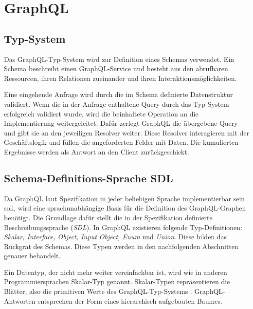 \chapter{GraphQL}
\section{Typ-System}

Das GraphQL-Typ-System wird zur Definition eines Schemas verwendet.
Ein Schema beschreibt einen GraphQL-Service und besteht aus den abrufbaren Ressourcen, ihren Relationen zueinander und ihren Interaktionsmöglichkeiten.


Eine eingehende Anfrage wird durch die im Schema definierte Datenstruktur validiert.
Wenn die in der Anfrage enthaltene Query durch das Typ-System erfolgreich validiert wurde, wird die beinhaltete Operation an die Implementierung weitergeleitet.
Dafür zerlegt GraphQL die übergebene Query und gibt sie an den jeweiligen Resolver weiter. Diese Resolver interagieren mit der Geschäftslogik und füllen die angeforderten Felder mit Daten.
Die kumulierten Ergebnisse werden als Antwort an den Client zurückgeschickt. 
\cite[S. 57-58]{kress2020graphql}
\cite[Abs. Schemadefinition]{graphqlOnline}


\section{Schema-Definitions-Sprache SDL}
Da GraphQL laut Spezifikation in jeder beliebigen Sprache implementierbar sein soll, wird eine sprachunabhängige Basis für die Definition des GraphQL-Graphen benötigt.
Die Grundlage dafür stellt die in der Spezifikation definierte Beschreibungssprache (\textit{SDL}). 
In GraphQL existieren folgende Typ-Definitionen: \textit{Skalar, Interface, Object, Input Object, Enum} und \textit{Union}.
Diese bilden das Rückgrat des Schemas.
Diese Typen werden in den nachfolgenden Abschnitten genauer behandelt.


Ein Datentyp, der nicht mehr weiter vereinfachbar ist, wird wie in anderen Programmiersprachen Skalar-Typ genannt.
Skalar-Typen repräsentieren die Blätter, also die primitiven Werte des GraphQL-Typ-Systems \cite[S. 60]{kress2020graphql}.
GraphQL-Antworten entsprechen der Form eines hierarchisch aufgebauten Baumes.
\newline


